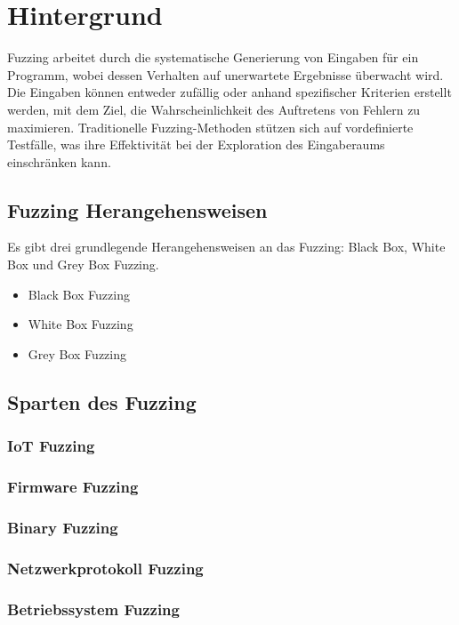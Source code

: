 
\section{Hintergrund}\label{sec:hintergrund}
Fuzzing arbeitet durch die systematische Generierung von Eingaben für ein Programm, wobei dessen Verhalten auf unerwartete
Ergebnisse überwacht wird.
Die Eingaben können entweder zufällig oder anhand spezifischer Kriterien erstellt werden, mit dem Ziel, die
Wahrscheinlichkeit des Auftretens von Fehlern zu maximieren.
Traditionelle Fuzzing-Methoden stützen sich auf vordefinierte Testfälle, was ihre Effektivität bei der Exploration
des Eingaberaums einschränken kann.
\subsection{Fuzzing Herangehensweisen}\label{subsec:testing-methoden}
Es gibt drei grundlegende Herangehensweisen an das Fuzzing: Black Box, White Box und Grey Box Fuzzing.
\begin{itemize}
    \item Black Box Fuzzing
    \item White Box Fuzzing
    \item Grey Box Fuzzing
\end{itemize}
\subsection{Sparten des Fuzzing}\label{subsec:sparten-des-fuzzing}
\subsubsection{IoT Fuzzing}
\subsubsection{Firmware Fuzzing}
\subsubsection{Binary Fuzzing}
\subsubsection{Netzwerkprotokoll Fuzzing}
\subsubsection{Betriebssystem Fuzzing}
